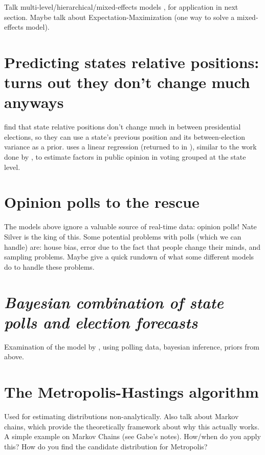 \documentclass[12pt]{report}
\begin{document}
Talk multi-level/hierarchical/mixed-effects models \citep{Gelman:2006aa,Gelman:2007aa}, for application in next section. Maybe talk about Expectation-Maximization (one way to solve a mixed-effects model).

\chapter{Predicting states relative positions: turns out they don't change much anyways}

\cite{Lock:2010aa} find that state relative positions don't change much in between presidential elections, so they can use a state's previous position and its between-election variance as a prior. \cite{Campbell:1992aa} uses a linear regression (returned to in \citealp{Campbell:2006aa}), similar to the work done by \cite{Hibbs:2008aa}, to estimate factors in public opinion in  voting grouped at the state level.

\chapter{Opinion polls to the rescue}

The models above ignore a valuable source of real-time data: opinion polls! Nate Silver \citeyearpar{Silver:2012aa} is the king of this. Some potential problems with polls (which we can handle) are: house bias, error due to the fact that people change their minds, and sampling problems. Maybe give a quick rundown of what some different models do to handle these problems.

\chapter{\emph{Bayesian combination of state polls and election forecasts}}

Examination of the model by \cite{Lock:2010aa}, using polling data, bayesian inference, priors from above.

\chapter{The Metropolis-Hastings algorithm}

Used for estimating distributions non-analytically. Also talk about Markov chains, which provide the theoretically framework about why this actually works. A simple example on Markov Chains (see Gabe's notes). How/when do you apply this? How do you find the candidate distribution for Metropolis?
\end{document}
